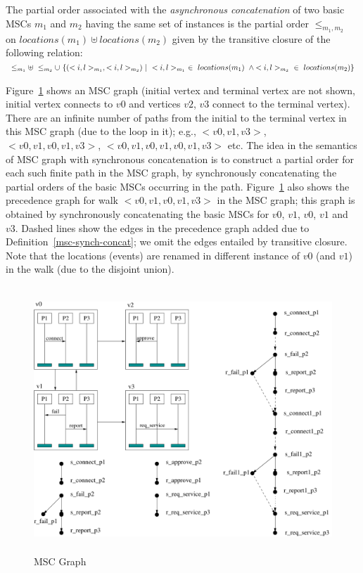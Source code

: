 \documentclass{entcs}
\begin{document}
\begin{definition}
\label{msc-asynch-concat}
The partial order associated with the \emph{asynchronous 
concatenation} of two basic MSCs $m_1$ and $m_2$ having 
the same set of instances is the partial order 
$\leq_{m_1,m_2}$ on $locations(m_1) \uplus locations(m_2)$ 
given by the transitive closure of the following relation:\\
$\leq_{m_1} \uplus~ \leq_{m_2} \cup~ \{(<i,l>_{m_1},
<i,l>_{m_2}) ~|~ <i,l>_{m_1} ~\in~ locations(m_1) \\
~\wedge \mbox{$<i,l>_{m_2}$} ~\in~ locations(m_2)\}$ 
\end{definition}

Figure~\ref{fig1} shows an MSC graph (initial vertex and terminal 
vertex are not shown, initial vertex connects to $v0$ and 
vertices $v2$, $v3$ connect to the terminal vertex). There 
are an infinite number of paths from the initial to the 
terminal vertex in this MSC graph (due to the loop in it); 
e.g., $<v0,v1,v3>$, $<v0,v1,v0,v1,v3>$, 
$<v0,v1,v0,v1,v0,v1,v3>$ etc. The idea in the semantics 
of MSC graph with synchronous concatenation is to construct a partial order for each 
such finite path in the MSC graph, by synchronously 
concatenating the partial orders of the basic MSCs 
occurring in the path. Figure~\ref{fig1} also shows the precedence 
graph for walk $<v0,v1,v0,v1,v3>$ in the MSC graph; this 
graph is obtained by synchronously concatenating the 
basic MSCs for $v0$, $v1$, $v0$, $v1$ and $v3$. Dashed 
lines show the edges in the precedence graph added due 
to Definition~\ref{msc-synch-concat}; we omit the edges entailed
by transitive closure. Note that the locations (events) 
are renamed in different instance of $v0$ (and $v1$) in 
the walk (due to the disjoint union).

\begin{figure}[t]
\centering
\includegraphics[height=10cm]{fig1}
\caption{MSC Graph}
\label{fig1}
\end{figure}
\end{document}
